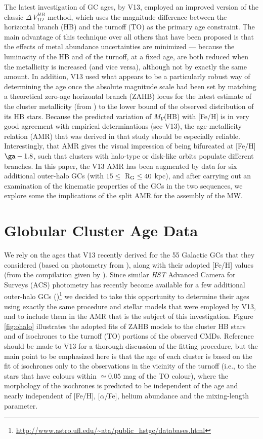 \documentclass[useAMS,usenatbib]{mn2e}
\begin{document}
The latest investigation of GC ages, by V13, employed an improved version of
the classic $\Delta\,V_{TO}^{HB}$ method, which uses the magnitude difference
between the horizontal branch (HB) and the turnoff (TO) as the primary age
constraint.  The main advantage of this technique over all others that have
been proposed is that the effects of metal abundance uncertainties are minimized
--- because the luminosity of the HB and of the turnoff, at a fixed age, are
both reduced when the metallicity is increased (and vice versa), although not by
exactly the same amount.  In 
addition, V13 used what appears to be a particularly robust way of determining
the age once the absolute magnitude scale had been set by matching a theoretical
zero-age horizontal branch (ZAHB) locus for the latest estimate of the cluster
metallicity (from \citealt{CG09}) to the lower bound of the observed
distribution of its HB stars.  Because the predicted variation of $M_V$(HB) with
[Fe/H] is in very good agreement with empirical determinations (see V13), the 
age-metallicity relation (AMR) that was derived in that study should be 
especially reliable.  Interestingly, that AMR gives the visual impression of
being bifurcated at [Fe/H] $\ga -1.8$, such that clusters with halo-type or
disk-like orbits populate different branches.  In this paper, the V13 AMR has
been augmented by data for six additional outer-halo GCs (with $15 \leq$
R$_{\rm G} \leq 40$ kpc), and after carrying out an examination of the kinematic 
properties of the GCs in the two sequences, we explore some the implications of
the split AMR for the assembly of the MW.
 
\section{Globular Cluster Age Data}
We rely on the ages that V13 recently derived for the 55 Galactic GCs that they
considered (based on photometry from \citealt{Sarajedini07}), along with their adopted [Fe/H] values (from the compilation given
by \citealt{CG09}).  Since similar {\it HST} Advanced Camera for Surveys (ACS)
photometry has recently become available for a few additional outer-halo GCs
(\citealt{Dotter11})\footnote{\url{
http://www.astro.ufl.edu/~ata/public_hstgc/databases.html}}
we decided to take
this opportunity to determine their ages using exactly the same procedure and
stellar models that were employed by V13, and to include them in the AMR that
is the subject of this investigation.  Figure \ref{fig:ohalo} illustrates the 
adopted fits of ZAHB models to the cluster HB stars and of isochrones to the
turnoff (TO) portions of the observed CMDs.  Reference should be made to V13
for a thorough discussion of the fitting procedure, but the main point to be
emphasized here is that the age of each cluster is based on the fit of
isochrones only to the observations in the vicinity of the turnoff (i.e., to
the stars that have colours within $\simeq 0.05$ mag of the TO colour), where
the morphology of the isochrones is predicted to be independent of the age and
nearly independent of [Fe/H], [$\alpha$/Fe], helium abundance 
and the mixing-length parameter.
\end{document}
